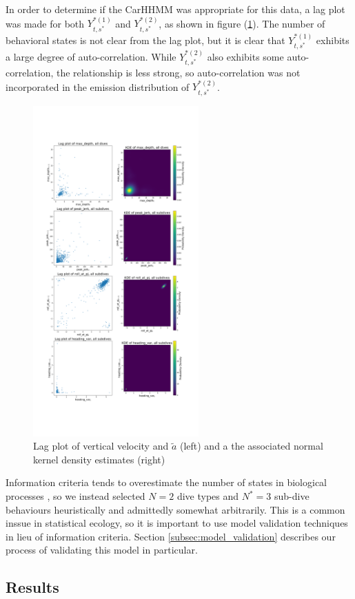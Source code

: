 In order to determine if the CarHHMM was appropriate for this data, a lag plot was made for both $Y^{*(1)}_{t,s^*}$ and $Y^{*(2)}_{t,s^*}$, as shown in figure (\ref{fig:lag}). The number of behavioral states is not clear from the lag plot, but it is clear that $Y^{*(1)}_{t,s^*}$ exhibits a large degree of auto-correlation. While $Y^{*(2)}_{t,s^*}$ also exhibits some auto-correlation, the relationship is less strong, so auto-correlation was not incorporated in the emission distribution of $Y^{*(2)}_{t,s^*}$. 

\begin{figure}[h!]
	\centering
	\includegraphics[height=5in]{../Plots/lagplot.png}
	\caption{Lag plot of vertical velocity and $\tilde a$ (left) and a the associated normal kernel density estimates (right)}
	\label{fig:lag}
\end{figure}

Information criteria tends to overestimate the number of states in biological processes \cite{Pohle:2017}, so we instead selected $N = 2$ dive types and $N^* = 3$ sub-dive behaviours heuristically and admittedly somewhat arbitrarily. This is a common inssue in statistical ecology, so it is important to use model validation techniques in lieu of information criteria. Section \ref{subsec:model_validation} describes our process of validating this model in particular.

\subsection{Results}

